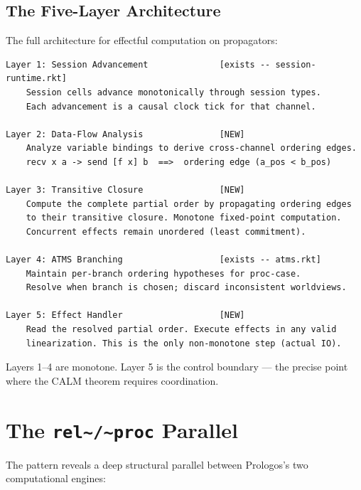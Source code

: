 \documentclass[11pt]{article}
\begin{document}
\subsection{The Five-Layer Architecture}
\label{sec:org4b1f51e}

The full architecture for effectful computation on propagators:

\begin{verbatim}
Layer 1: Session Advancement              [exists -- session-runtime.rkt]
    Session cells advance monotonically through session types.
    Each advancement is a causal clock tick for that channel.

Layer 2: Data-Flow Analysis               [NEW]
    Analyze variable bindings to derive cross-channel ordering edges.
    recv x a -> send [f x] b  ==>  ordering edge (a_pos < b_pos)

Layer 3: Transitive Closure               [NEW]
    Compute the complete partial order by propagating ordering edges
    to their transitive closure. Monotone fixed-point computation.
    Concurrent effects remain unordered (least commitment).

Layer 4: ATMS Branching                   [exists -- atms.rkt]
    Maintain per-branch ordering hypotheses for proc-case.
    Resolve when branch is chosen; discard inconsistent worldviews.

Layer 5: Effect Handler                   [NEW]
    Read the resolved partial order. Execute effects in any valid
    linearization. This is the only non-monotone step (actual IO).
\end{verbatim}

Layers 1--4 are monotone. Layer 5 is the control boundary --- the precise
point where the CALM theorem requires coordination.
\section{The \texttt{rel\textasciitilde{}/\textasciitilde{}proc} Parallel}
\label{sec:orga17b511}

The pattern reveals a deep structural parallel between Prologos's two
computational engines:
\end{document}
